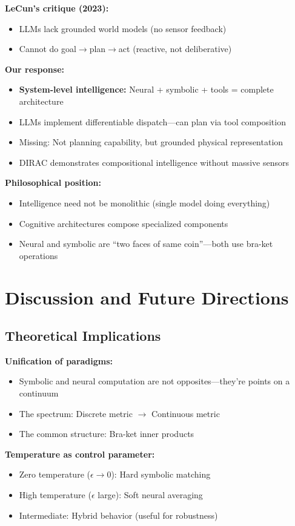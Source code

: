 \documentclass[11pt,a4paper]{article}
\theoremstyle{definition}
\begin{document}
\textbf{LeCun's critique (2023):}
\begin{itemize}
\item LLMs lack grounded world models (no sensor feedback)
\item Cannot do goal$\to$plan$\to$act (reactive, not deliberative)
\end{itemize}

\textbf{Our response:}
\begin{itemize}
\item \textbf{System-level intelligence:} Neural + symbolic + tools = complete architecture
\item LLMs implement differentiable dispatch---can plan via tool composition
\item Missing: Not planning capability, but grounded physical representation
\item DIRAC demonstrates compositional intelligence without massive sensors
\end{itemize}

\textbf{Philosophical position:}
\begin{itemize}
\item Intelligence need not be monolithic (single model doing everything)
\item Cognitive architectures compose specialized components
\item Neural and symbolic are ``two faces of same coin''---both use bra-ket operations
\end{itemize}

\section{Discussion and Future Directions}

\subsection{Theoretical Implications}

\textbf{Unification of paradigms:}
\begin{itemize}
\item Symbolic and neural computation are not opposites---they're points on a continuum
\item The spectrum: Discrete metric $\to$ Continuous metric
\item The common structure: Bra-ket inner products
\end{itemize}

\textbf{Temperature as control parameter:}
\begin{itemize}
\item Zero temperature ($\epsilon \to 0$): Hard symbolic matching
\item High temperature ($\epsilon$ large): Soft neural averaging
\item Intermediate: Hybrid behavior (useful for robustness)
\end{itemize}
\end{document}
